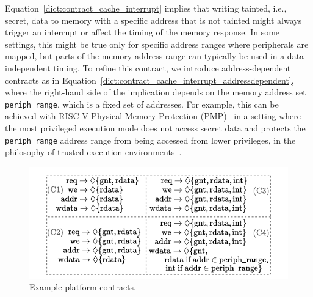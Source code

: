 Equation~\ref{dict:contract_cache_interrupt} implies that writing tainted, i.e., secret, data to memory with a specific address that is not tainted might always trigger an interrupt or affect the timing of the memory response. In some settings, this might be true only for specific address ranges where peripherals are mapped, but parts of the memory address range can typically be used in a data-independent timing.
To refine this contract, we introduce address-dependent contracts as in Equation~\ref{dict:contract_cache_interrupt_addressdependent}, where the right-hand side of the implication depends on the memory address set \texttt{periph\_range}, which is a fixed set of addresses.
For example, this can be achieved with RISC-V Physical Memory Protection (PMP)~\cite{riscv_privileged} in a setting where the most privileged execution mode does not access secret data and protects the \texttt{periph\_range} address range from being accessed from lower privileges, in the philosophy of trusted execution environments~\cite{lee2019keystone,costan2016sanctum,mckeen2013intel,arm2009trustzone,nasahl2020hector,mcgillion2015opentee,lebedev2018sanctorum,schneider2022sok,bourgeat2018mi6,brasser2022tcx}.



\begin{figure}
    \begin{center}
    \includegraphics[width=\columnwidth]{figures/contract_equations/contract_equations.pdf}
    \end{center}
    \vspace{-1.8em}
    \caption{Example platform contracts.}
    \label{fig:contract_equations}
    \vspace*{-1.5em} 
\end{figure}

